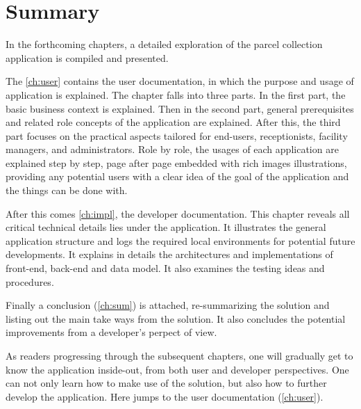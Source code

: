 \section{Summary}
\label{sec:IntroSum}

In the forthcoming chapters, a detailed exploration of the parcel collection application is compiled and presented. 

The \autoref{ch:user} contains the user documentation, in which the purpose and usage of application is explained. The chapter falls into three parts. In the first part, the basic business context is explained. Then in the second part, general prerequisites and related role concepts of the application are explained. After this, the third part focuses on the practical aspects tailored for end-users, receptionists, facility managers, and administrators. Role by role, the usages of each application are explained step by step, page after page embedded with rich images illustrations, providing any potential users with a clear idea of the goal of the application and the things can be done with. 

After this comes \autoref{ch:impl}, the developer documentation. This chapter reveals all critical technical details lies under the application. It illustrates the general application structure and logs the required local environments for potential future developments. It explains in details the architectures and implementations of front-end, back-end and data model. It also examines the testing ideas and procedures. 

Finally a conclusion (\autoref{ch:sum}) is attached, re-summarizing the solution and listing out the main take ways from the solution. It also concludes the potential improvements from a developer's perpect of view.

As readers progressing through the subsequent chapters, one will gradually get to know the application inside-out, from both user and developer perspectives. One can not only learn how to make use of the solution, but also how to further develop the application.
Here jumps to the user documentation (\autoref{ch:user}).



